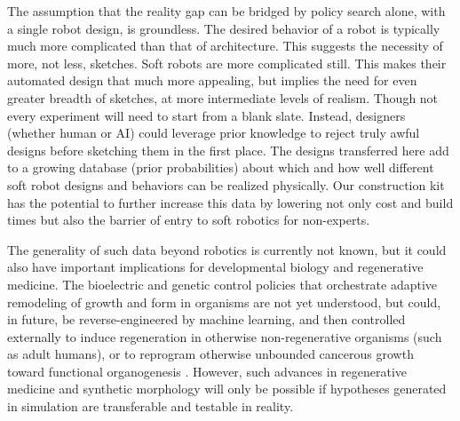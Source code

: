 The assumption that the reality gap can be bridged by policy search alone, with a single robot design, is groundless. 
The desired behavior of a robot is typically much more complicated than that of architecture.
This suggests the necessity of more, not less, sketches.
Soft robots are more complicated still.
This makes their automated design that much more appealing, but implies the need for even greater breadth of sketches, at more intermediate levels of realism.
Though not every experiment will need to start from a blank slate.
Instead, designers (whether human or AI) could leverage prior knowledge to reject truly awful designs before sketching them in the first place.
The designs transferred here add to a growing database (prior probabilities) about which and how well different soft robot designs and behaviors can be realized physically.
Our construction kit has the potential to further increase this data by lowering not only cost and build times but also the barrier of entry to soft robotics for non-experts.


The generality of such data beyond robotics is currently not known, but it could also have important implications for developmental biology and regenerative medicine.
The bioelectric and genetic control policies that orchestrate adaptive remodeling of growth and form in organisms are not yet understood, but could, in future, be reverse-engineered by machine learning, and then controlled externally to induce regeneration in otherwise non-regenerative organisms (such as adult humans), or to reprogram otherwise unbounded cancerous growth toward functional organogenesis \cite{levin2013reprogramming}.
However, such advances in regenerative medicine and synthetic morphology will only be possible if hypotheses generated in simulation are transferable and testable in reality.


